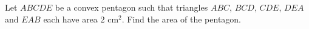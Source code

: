 Let $ABCDE$ be a convex pentagon such that triangles $ABC$, $BCD$, $CDE$, $DEA$ and $EAB$ each have area $2\text{ cm}^2$. Find the area of the pentagon.
